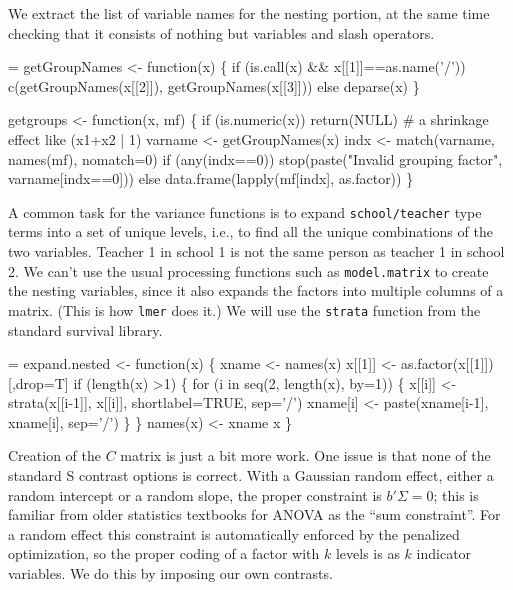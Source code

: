 \documentclass{article}
\begin{document}
We extract the list of variable names for the nesting portion,
at the same time checking that it consists of nothing but variables
and slash operators.
\begin{nwchunk}
=
 getGroupNames <- function(x) \{
     if (is.call(x) && x[[1]]==as.name('/')) 
         c(getGroupNames(x[[2]]), getGroupNames(x[[3]]))
     else deparse(x)
     \}
 
 getgroups <- function(x, mf) \{
     if (is.numeric(x)) return(NULL)  # a shrinkage effect like (x1+x2 | 1)
     varname <- getGroupNames(x)
     indx <- match(varname, names(mf), nomatch=0)
     if (any(indx==0)) stop(paste("Invalid grouping factor", varname[indx==0]))
     else data.frame(lapply(mf[indx], as.factor))
     \}
\end{nwchunk}
A common task for the variance functions is to expand \Verb!school/teacher!
type terms into a set of unique levels, i.e., to find all the unique
combinations of the two variables.  Teacher 1 in school 1 is not the same
person as teacher 1 in school 2.
We can't use the usual processing functions such as \Verb!model.matrix!  %
to create the nesting variables, since it also expands the factors
into multiple columns of a matrix.  (This is how \Verb!lmer! does it.)
We will use the \Verb!strata! function from the standard survival library.
\begin{nwchunk}
=
 expand.nested <- function(x) \{
     xname <- names(x)
     x[[1]] <- as.factor(x[[1]])[,drop=T]
     if (length(x) >1) \{
         for (i in seq(2, length(x), by=1)) \{
             x[[i]] <- strata(x[[i-1]], x[[i]], shortlabel=TRUE, sep='/')
             xname[i] <- paste(xname[i-1], xname[i], sep='/')
             \}
        \} 
     names(x) <- xname
     x
     \}
\end{nwchunk}

Creation of the $C$ matrix is just a bit more work.  
One issue is that none of the standard S contrast options is correct.
With a Gaussian random effect, either a random intercept or a random slope,  
the proper constraint is $b' \Sigma =0$;       %
this is familiar from older statistics textbooks for ANOVA as the ``sum 
constraint''. 
For a random effect this constraint is automatically enforced by the 
penalized optimization, so the proper coding of a factor with $k$ levels
is as $k$ indicator variables.
We do this by imposing our own contrasts. 
\end{document}
